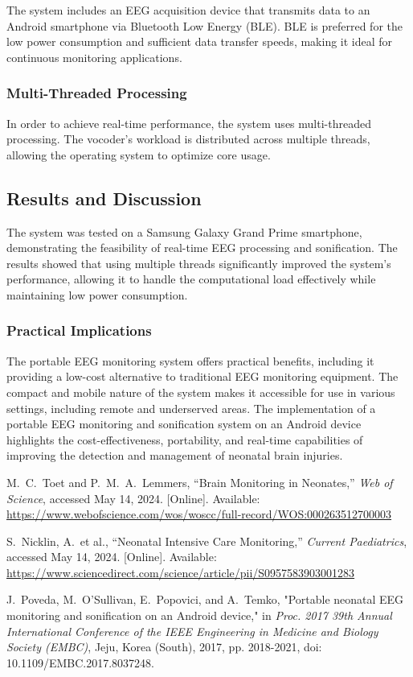 \documentclass[12pt,journal,compsoc]{IEEEtran}
\begin{document}
The system includes an EEG acquisition device that transmits data to an Android smartphone via Bluetooth Low Energy (BLE). BLE is preferred for the low power consumption and sufficient data transfer speeds, making it ideal for continuous monitoring applications. 

\subsubsection{Multi-Threaded Processing}
In order to achieve real-time performance, the system uses multi-threaded processing. The vocoder's workload is distributed across multiple threads, allowing the operating system to optimize core usage.  

\subsection{Results and Discussion}
The system was tested on a Samsung Galaxy Grand Prime smartphone, demonstrating the feasibility of real-time EEG processing and sonification. The results showed that using multiple threads significantly improved the system's performance, allowing it to handle the computational load effectively while maintaining low power consumption.  

\subsubsection{Practical Implications}
The portable EEG monitoring system offers practical benefits, including it providing a low-cost alternative to traditional EEG monitoring equipment. The compact and mobile nature of the system makes it accessible for use in various settings, including remote and underserved areas. The implementation of a portable EEG monitoring and sonification system on an Android device highlights the cost-effectiveness, portability, and real-time capabilities of improving the detection and management of neonatal brain injuries.

\begin{thebibliography}{1}

M.~C.~Toet and P.~M.~A.~Lemmers, “Brain Monitoring in Neonates,” \emph{Web of Science}, accessed May 14, 2024. [Online]. Available: \url{https://www.webofscience.com/wos/woscc/full-record/WOS:000263512700003}

S.~Nicklin, A.~et al., “Neonatal Intensive Care Monitoring,” \emph{Current Paediatrics}, accessed May 14, 2024. [Online]. Available: \url{https://www.sciencedirect.com/science/article/pii/S0957583903001283}

J.~Poveda, M.~O'Sullivan, E.~Popovici, and A.~Temko, "Portable neonatal EEG monitoring and sonification on an Android device," in \emph{Proc. 2017 39th Annual International Conference of the IEEE Engineering in Medicine and Biology Society (EMBC)}, Jeju, Korea (South), 2017, pp. 2018-2021, doi: 10.1109/EMBC.2017.8037248.

\end{thebibliography}
\end{document}
